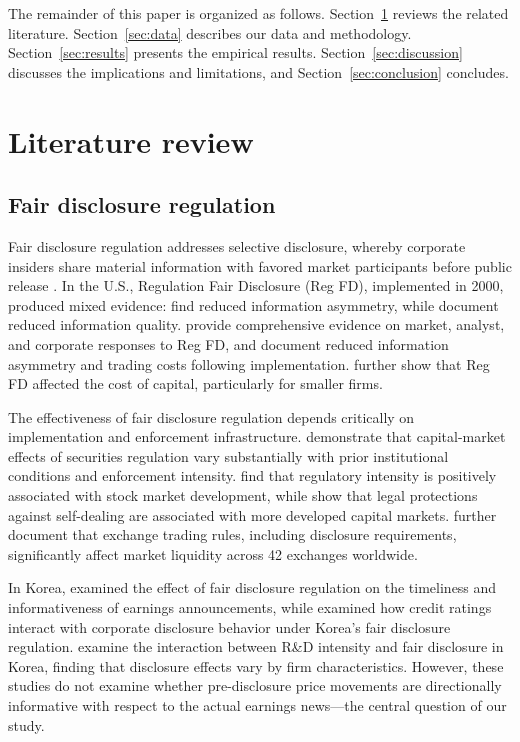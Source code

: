\documentclass[review,authoryear]{elsarticle}
\begin{document}
The remainder of this paper is organized as follows. Section~\ref{sec:lit} reviews the related literature. Section~\ref{sec:data} describes our data and methodology. Section~\ref{sec:results} presents the empirical results. Section~\ref{sec:discussion} discusses the implications and limitations, and Section~\ref{sec:conclusion} concludes.

\section{Literature review}
\label{sec:lit}

\subsection{Fair disclosure regulation}

Fair disclosure regulation addresses selective disclosure, whereby corporate insiders share material information with favored market participants before public release \citep{heflin2003regulation}. In the U.S., Regulation Fair Disclosure (Reg FD), implemented in 2000, produced mixed evidence: \citet{ahmed2003impact} find reduced information asymmetry, while \citet{heflin2003regulation} document reduced information quality. \citet{bailey2003regulation} provide comprehensive evidence on market, analyst, and corporate responses to Reg FD, and \citet{eleswarapu2004impact} document reduced information asymmetry and trading costs following implementation. \citet{gomes2007sec} further show that Reg FD affected the cost of capital, particularly for smaller firms.

The effectiveness of fair disclosure regulation depends critically on implementation and enforcement infrastructure. \citet{christensen2013capital} demonstrate that capital-market effects of securities regulation vary substantially with prior institutional conditions and enforcement intensity. \citet{jackson2009regulatory} find that regulatory intensity is positively associated with stock market development, while \citet{djankov2008law} show that legal protections against self-dealing are associated with more developed capital markets. \citet{cumming2011exchange} further document that exchange trading rules, including disclosure requirements, significantly affect market liquidity across 42 exchanges worldwide.

In Korea, \citet{yun2012fair} examined the effect of fair disclosure regulation on the timeliness and informativeness of earnings announcements, while \citet{oh2017disclosure} examined how credit ratings interact with corporate disclosure behavior under Korea's fair disclosure regulation. \citet{lee2019regulation} examine the interaction between R\&D intensity and fair disclosure in Korea, finding that disclosure effects vary by firm characteristics. However, these studies do not examine whether pre-disclosure price movements are directionally informative with respect to the actual earnings news---the central question of our study.
\end{document}
